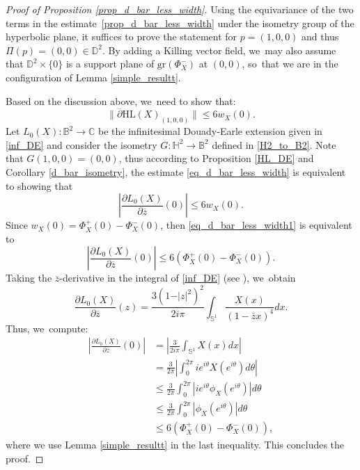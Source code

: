 \documentclass[11pt]{article}
\theoremstyle{plain}
\theoremstyle{definition}
\begin{document}
\begin{proof}[Proof of Proposition \ref{prop_d_bar_less_width}]
Using the equivariance of the two terms in the estimate~\eqref{prop_d_bar_less_width} under the isometry group of the hyperbolic plane, it suffices to prove the statement for \(p = (1,0,0) \) and thus \(\Pi(p) = (0,0) \in \mathbb{D}^2\). By adding a Killing vector field, we~may also assume that \(\mathbb{D}^2 \times \{0\}\) is a support plane of \(\mathrm{gr}(\Phi_X^-)\) at \((0,0)\), so~that we are in the configuration of Lemma \ref{simple_resultt}.

Based on the discussion above, we~need to show that:
\begin{equation}\label{eq_d_bar_less_width}
\lVert \overline{\partial} \mathrm{HL}(X)_{(1,0,0)} \rVert \leq 6 w_X(0).
\end{equation}
Let \(L_0(X): \mathbb{B}^2 \to \mathbb{C} \) be the infinitesimal Douady-Earle extension given in \eqref{inf_DE} and consider the isometry \(G:\mathbb{H}^2 \to \mathbb{B}^2 \) defined in \eqref{H2_to_B2}. Note that \(G(1,0,0) = (0,0) \), thus according to Proposition \ref{HL_DE} and Corollary \ref{d_bar_isometry}, the estimate \eqref{eq_d_bar_less_width} is equivalent to showing that
\begin{equation}\label{eq_d_bar_less_width1}
\left| \frac{\partial L_0(X)}{\partial \overline{z}}(0) \right| \leq 6 w_X(0).
\end{equation}
Since \(w_X(0) = \Phi_X^+(0) - \Phi_X^-(0) \), then \eqref{eq_d_bar_less_width1} is equivalent to
\[
\left| \frac{\partial L_0(X)}{\partial \overline{z}}(0) \right| \leq 6(\Phi_X^+(0) - \Phi_X^-(0)).
\]
Taking the \(\overline{z}\)-derivative in the integral of \eqref{inf_DE} (see \cite[p.\,380]{Extension_with_bounded_derivative}), we~obtain
\[
\frac{\partial L_0(X)}{\partial \overline{z}}(z) = \frac{3(1 - \vert z \vert^2)^2}{2i\pi} \int_{\mathbb{S}^1} \frac{X(x)}{(1 - \overline{z}x)^4} dx.
\]
Thus, we~compute:
\begin{align*}
\left| \frac{\partial L_0(X)}{\partial \overline{z}}(0) \right| &= \left| \frac{3}{2i\pi} \int_{\mathbb{S}^1} X(x) dx \right| \\
&= \frac{3}{2\pi} \left| \int_{0}^{2\pi} i e^{i\theta} X(e^{i\theta}) d\theta \right| \\
&\leq \frac{3}{2\pi} \int_{0}^{2\pi} \left| i e^{i\theta} \phi_X(e^{i\theta}) \right| d\theta \\
&\leq \frac{3}{2\pi} \int_{0}^{2\pi} \left| \phi_X(e^{i\theta}) \right| d\theta \\
&\leq 6(\Phi_X^+(0) - \Phi_X^-(0)),
\end{align*}
where we use Lemma \ref{simple_resultt} in the last inequality. This concludes the proof.
\end{proof}
\end{document}
